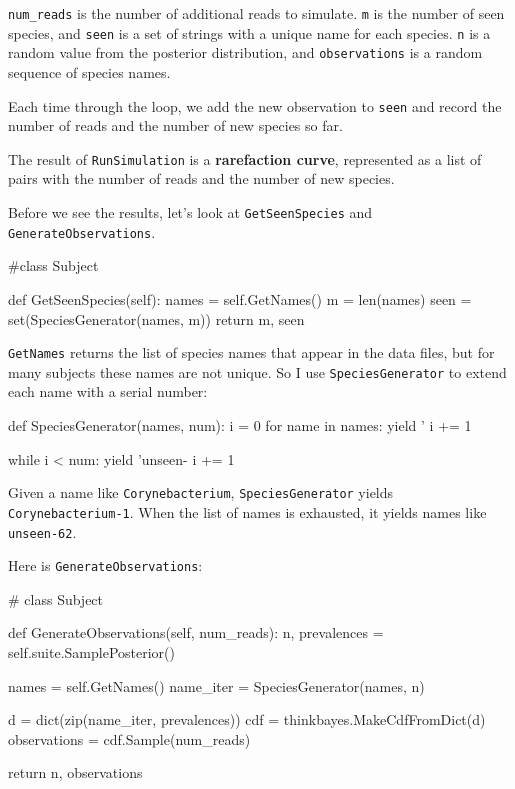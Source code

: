 \documentclass[12pt]{book}
\theoremstyle{exercise}
\begin{document}
\verb"num_reads" is the number of additional reads to simulate.
{\tt m} is the number of seen species, and {\tt seen} is a set of
strings with a unique name for each species.
{\tt n} is a random value from the posterior distribution, and
{\tt observations} is a random sequence of species names.

Each time through the loop, we add the new observation to
{\tt seen} and record the number of reads and the number of
new species so far.

The result of {\tt RunSimulation} is a {\bf rarefaction curve},
represented as a list of pairs with the number of reads and
the number of new species.

Before we see the results, let's look at {\tt GetSeenSpecies} and
{\tt GenerateObservations}.

\begin{code}
#class Subject

    def GetSeenSpecies(self):
        names = self.GetNames()
        m = len(names)
        seen = set(SpeciesGenerator(names, m))
        return m, seen
\end{code}

{\tt GetNames} returns the list of species names that appear in
the data files, but for many subjects these names are not unique.
So I use {\tt SpeciesGenerator} to extend each name with a serial
number:

\begin{code}
def SpeciesGenerator(names, num):
    i = 0
    for name in names:
        yield '%
        i += 1

    while i < num:
        yield 'unseen-%
        i += 1
\end{code}

Given a name like {\tt Corynebacterium}, {\tt SpeciesGenerator} yields
{\tt Corynebacterium-1}.  When the list of names is exhausted, it
yields names like {\tt unseen-62}.

Here is {\tt GenerateObservations}:

\begin{code}
# class Subject

    def GenerateObservations(self, num_reads):
        n, prevalences = self.suite.SamplePosterior()

        names = self.GetNames()
        name_iter = SpeciesGenerator(names, n)

        d = dict(zip(name_iter, prevalences))
        cdf = thinkbayes.MakeCdfFromDict(d)
        observations = cdf.Sample(num_reads)

        return n, observations
\end{code}
\end{document}
